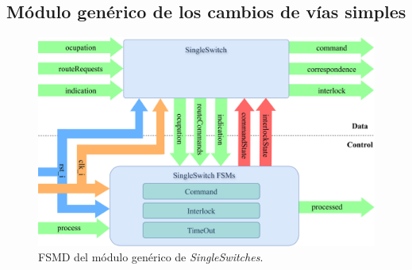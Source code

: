 \subsection{Módulo genérico de los cambios de vías simples}

\lipsum[1]

\begin{figure}[H]
	\centering
	\includegraphics[width=1\textwidth]{Figuras/SSW_module}
	\centering\caption{FSMD del módulo genérico de \textit{SingleSwitches}.}
	\label{fig:SSW_module}
\end{figure}

\lipsum[1]